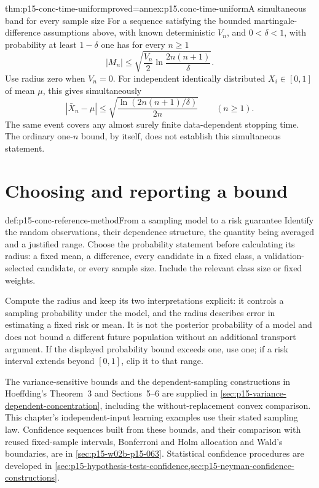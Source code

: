 \begin{hbtheorem}{thm:p15-conc-time-uniform}{proved=annex:p15.conc-time-uniform}{A simultaneous band for every sample size}
For a sequence satisfying the bounded martingale-difference assumptions
above, with known deterministic \(V_n\), and \(0<\delta<1\),
with probability at least \(1-\delta\) one has for every \(n\geq1\)
\[
                 |M_n|\leq
                 \sqrt{\frac{V_n}{2}\ln\frac{2n(n+1)}{\delta}}.
\]
Use radius zero when \(V_n=0\).
For independent identically distributed \(X_i\in[0,1]\) of
mean \(\mu\), this gives simultaneously
\[
        |\bar X_n-\mu|
             \leq\sqrt{\frac{\ln(2n(n+1)/\delta)}{2n}}
                                  \qquad(n\geq1).
\]
The same event covers any almost surely finite data-dependent stopping
time. The ordinary one-\(n\) bound, by itself, does not establish
this simultaneous statement.
\end{hbtheorem}

\section{Choosing and reporting a bound}

\begin{hbmethod}{def:p15-conc-reference-method}{From a sampling model to a risk guarantee}
Identify the random observations, their dependence structure, the
quantity being averaged and a justified range. Choose the probability
statement before calculating its radius: a fixed mean, a difference,
every candidate in a fixed class, a validation-selected candidate, or
every sample size. Include the relevant class size or fixed weights.

Compute the radius and keep its two interpretations explicit:
it controls a sampling probability under the model, and the radius
describes error in estimating a fixed risk or mean. It is not the
posterior probability of a model and does not bound a different future
population without an additional transport argument.
If the displayed probability bound exceeds one, use one; if a risk
interval extends beyond \([0,1]\), clip it to that range.
\end{hbmethod}

The variance-sensitive bounds and the dependent-sampling constructions
in Hoeffding's Theorem~3 and Sections~5--6 are supplied in
\cref{sec:p15-variance-dependent-concentration}, including the
without-replacement convex comparison. This chapter's independent-input
learning examples use their stated sampling law. Confidence sequences
built from these bounds, and their comparison with reused fixed-sample
intervals, Bonferroni and Holm allocation and Wald's boundaries, are in
\cref{sec:p15-w02b-p15-063}. Statistical confidence procedures are
developed in
\cref{sec:p15-hypothesis-tests-confidence,sec:p15-neyman-confidence-constructions}.
